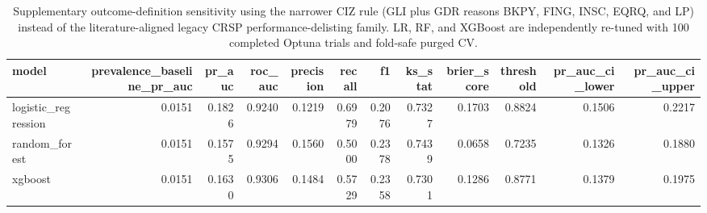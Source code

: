 \begin{table}[htbp]
\centering
\caption{Supplementary outcome-definition sensitivity using the narrower CIZ rule (GLI plus GDR reasons BKPY, FING, INSC, EQRQ, and LP) instead of the literature-aligned legacy CRSP performance-delisting family. LR, RF, and XGBoost are independently re-tuned with 100 completed Optuna trials and fold-safe purged CV.}
\label{tab:narrow_label_sensitivity}
\small
\begin{tabular}{lrrrrrrrrrrr}
\toprule
model & prevalence\_baseline\_pr\_auc & pr\_auc & roc\_auc & precision & recall & f1 & ks\_stat & brier\_score & threshold & pr\_auc\_ci\_lower & pr\_auc\_ci\_upper \\
\midrule
logistic\_regression & 0.0151 & 0.1826 & 0.9240 & 0.1219 & 0.6979 & 0.2076 & 0.7327 & 0.1703 & 0.8824 & 0.1506 & 0.2217 \\
random\_forest & 0.0151 & 0.1575 & 0.9294 & 0.1560 & 0.5000 & 0.2378 & 0.7439 & 0.0658 & 0.7235 & 0.1326 & 0.1880 \\
xgboost & 0.0151 & 0.1630 & 0.9306 & 0.1484 & 0.5729 & 0.2358 & 0.7301 & 0.1286 & 0.8771 & 0.1379 & 0.1975 \\
\bottomrule
\end{tabular}
\end{table}
